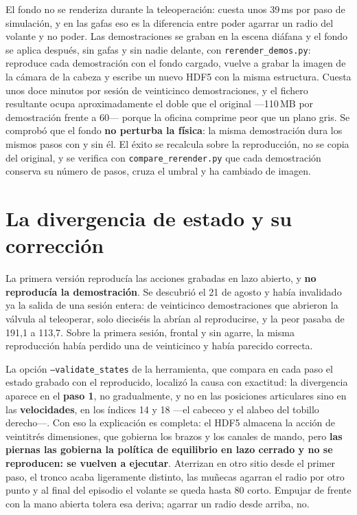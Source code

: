 El fondo no se renderiza durante la teleoperación: cuesta unos 39\,ms por paso de simulación, y
en las gafas eso es la diferencia entre poder agarrar un radio del volante y no poder. Las
demostraciones se graban en la escena diáfana y el fondo se aplica después, sin gafas y sin nadie
delante, con \texttt{rerender\_demos.py}: reproduce cada demostración con el fondo cargado, vuelve
a grabar la imagen de la cámara de la cabeza y escribe un nuevo HDF5 con la misma estructura. Cuesta
unos doce minutos por sesión de veinticinco demostraciones, y el fichero resultante ocupa
aproximadamente el doble que el original —110\,MB por demostración frente a 60— porque la oficina
comprime peor que un plano gris. Se comprobó que el fondo \textbf{no perturba la física}: la misma
demostración dura los mismos pasos con y sin él. El éxito se recalcula sobre la reproducción, no se
copia del original, y se verifica con \texttt{compare\_rerender.py} que cada demostración conserva
su número de pasos, cruza el umbral y ha cambiado de imagen.

\section{La divergencia de estado y su corrección}

La primera versión reproducía las acciones grabadas en lazo abierto, y \textbf{no reproducía la
demostración}. Se descubrió el 21 de agosto y había invalidado ya la salida de una sesión entera:
de veinticinco demostraciones que abrieron la válvula al teleoperar, solo dieciséis la abrían al
reproducirse, y la peor pasaba de 191,1\textdegree{} a 113,7\textdegree. Sobre la primera sesión,
frontal y sin agarre, la misma reproducción había perdido una de veinticinco y había parecido
correcta.

La opción \texttt{--validate\_states} de la herramienta, que compara en cada paso el estado
grabado con el reproducido, localizó la causa con exactitud: la divergencia aparece en el
\textbf{paso 1}, no gradualmente, y no en las posiciones articulares sino en las
\textbf{velocidades}, en los índices 14 y 18 —el cabeceo y el alabeo del tobillo derecho—. Con eso
la explicación es completa: el HDF5 almacena la acción de veintitrés dimensiones, que gobierna los
brazos y los canales de mando, pero \textbf{las piernas las gobierna la política de equilibrio en
lazo cerrado y no se reproducen: se vuelven a ejecutar}. Aterrizan en otro sitio desde el primer
paso, el tronco acaba ligeramente distinto, las muñecas agarran el radio por otro punto y al final
del episodio el volante se queda hasta 80\textdegree{} corto. Empujar de frente con la mano abierta
tolera esa deriva; agarrar un radio desde arriba, no.

